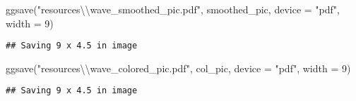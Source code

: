 \documentclass[
]{article}
\newenvironment{Shaded}{\begin{snugshade}}{\end{snugshade}}
\newcommand{\AttributeTok}[1]{\textcolor[rgb]{0.77,0.63,0.00}{#1}}
\newcommand{\DecValTok}[1]{\textcolor[rgb]{0.00,0.00,0.81}{#1}}
\newcommand{\FunctionTok}[1]{\textcolor[rgb]{0.00,0.00,0.00}{#1}}
\newcommand{\NormalTok}[1]{#1}
\newcommand{\OtherTok}[1]{\textcolor[rgb]{0.56,0.35,0.01}{#1}}
\newcommand{\SpecialCharTok}[1]{\textcolor[rgb]{0.00,0.00,0.00}{#1}}
\newcommand{\StringTok}[1]{\textcolor[rgb]{0.31,0.60,0.02}{#1}}
\begin{document}
\begin{Shaded}
\begin{Highlighting}[]
\FunctionTok{ggsave}\NormalTok{(}\StringTok{"resources}\SpecialCharTok{\textbackslash{}\textbackslash{}}\StringTok{wave\_smoothed\_pic.pdf"}\NormalTok{, smoothed\_pic, }\AttributeTok{device =} \StringTok{"pdf"}\NormalTok{, }\AttributeTok{width =} \DecValTok{9}\NormalTok{)}
\end{Highlighting}
\end{Shaded}

\begin{verbatim}
## Saving 9 x 4.5 in image
\end{verbatim}

\begin{Shaded}
\begin{Highlighting}[]
\FunctionTok{ggsave}\NormalTok{(}\StringTok{"resources}\SpecialCharTok{\textbackslash{}\textbackslash{}}\StringTok{wave\_colored\_pic.pdf"}\NormalTok{, col\_pic, }\AttributeTok{device =} \StringTok{"pdf"}\NormalTok{, }\AttributeTok{width =} \DecValTok{9}\NormalTok{)}
\end{Highlighting}
\end{Shaded}

\begin{verbatim}
## Saving 9 x 4.5 in image
\end{verbatim}

\begin{Shaded}
\end{Shaded}
\end{document}
